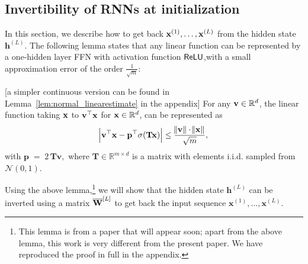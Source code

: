 
\subsection{Invertibility of RNNs at initialization}\label{sec:invertibility}
In this section, we describe how to get back $\mathbf{x}^{(1)}, \ldots, \mathbf{x}^{(L)}$ from the hidden state $\mathbf{h}^{(L)}$. %
The following lemma states that any linear function can be represented by a one-hidden layer FFN with activation function $\mathsf{ReLU}$,with a small approximation error of the order $\frac{1}{\sqrt{m}}$:
\begin{lemma}\label{lem:normal_linearestimate_appr_outline} [a simpler continuous version can be found in Lemma~\ref{lem:normal_linearestimate} in the appendix]
	For any $\mathbf{v} \in \mathbb{R}^d$, the linear function taking $\mathbf{x}$ to $\mathbf{v}^\top \mathbf{x}$ for $\mathbf{x} \in \mathbb{R}^d$, can be represented as
	\begin{equation}
		\abs{\mathbf{v}^\top \mathbf{x} -  \mathbf{p}^{\top} \sigma(\mathbf{T} \mathbf{x})} \le \frac{\norm{\mathbf{v}} \cdot \norm{\mathbf{x}}}{\sqrt{m}},
	\end{equation}
	with 
	$\mathbf{p} \;=\;  2 \, \mathbf{T} \mathbf{v},$ where $\mathbf{T} \in \mathbb{R}^{m \times d}$ is a matrix with elements i.i.d. sampled from $\mathcal{N}(0, 1)$. 
\end{lemma}
Using the above lemma,\footnote{This lemma is from a paper that will appear soon; apart from the above lemma, 
	this work is very different from the present paper. We have reproduced the proof in full in the appendix.} we will show that the hidden state $\mathbf{h}^{(L)}$ can be inverted using a matrix $\overline{\mathbf{W}}^{[L]}$ to get back the input sequence $\mathbf{x}^{(1)}, \ldots, \mathbf{x}^{(L)}$. 


